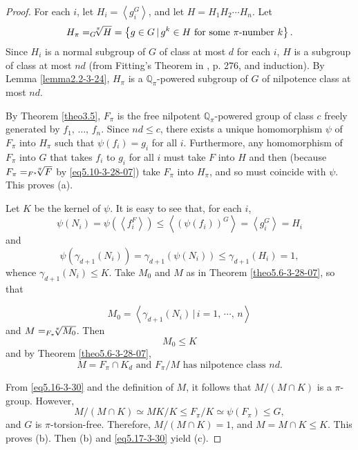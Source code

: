 \documentclass[mathscr]{amsart}
\theoremstyle{theorem}
\theoremstyle{definition}
\numberwithin{equation}{section}
\def \({\left(}
\def \){\right)}
\begin{document}
\begin{proof}
For each $i$, let $H_i=\left\langle g_i^G\right\rangle$, and let
$H=H_1H_2\cdots H_n$.  Let
$$
H_\pi=_G\hspace*{-0.2cm}\sqrt[\pi]{H}=\left\{g\in G\,|\,g^k\in
H\text{ for some }\pi\text{-number }k\right\}.
$$
Since $H_i$ is a normal subgroup of $G$ of class at most $d$ for
each $i$, $H$ is a subgroup of class at most $nd$ (from Fitting's
Theorem in \cite{Hup}, p. 276, and induction).  By Lemma
\ref{lemma2.2-3-24}, $H_\pi$ is a $\mathbb{Q}_\pi$-powered subgroup
of $G$ of nilpotence class at most $nd$.

By Theorem \ref{theo3.5}, $F_\pi$ is the free nilpotent
$\mathbb{Q}_\pi$-powered group of class $c$ freely generated by
$f_1,\,\dots,\,f_n$.  Since $nd\leq c$, there exists a unique
homomorphism $\psi$ of $F_\pi$ into $H_\pi$ such that
$\psi\(f_i\)=g_i$ for all $i$.  Furthermore, any homomorphism of
$F_\pi$ into $G$ that takes $f_i$ to $g_i$ for all $i$ must take $F$
into $H$ and then (because
$F_\pi=_{F^\star}\hspace*{-0.2cm}\sqrt[\pi]{F}$ by
\eqref{eq5.10-3-28-07}) take $F_\pi$ into $H_\pi$, and so must
coincide with $\psi$. This proves (a).

Let $K$ be the kernel of $\psi$.  It is easy to see that, for each
$i$,
$$
\psi\(N_i\)=\psi\(\left\langle f_i^F\right\rangle\)\leq\left\langle
\(\psi\(f_i\)\)^G\right\rangle =\left\langle g_i^G\right\rangle =
H_i
$$
and
$$
\psi\(\gamma_{d+1}\(N_i\)\)=\gamma_{d+1}\(\psi\(N_i\)\)\leq
\gamma_{d+1}\(H_i\)=1,
$$
whence $\gamma_{d+1}\(N_i\)\leq K$.  Take $M_0$ and $M$ as in
Theorem \ref{theo5.6-3-28-07}, so that

$$
M_0=\left\langle \gamma_{d+1}\(N_i\)\,|\,i=1,\,\cdots,\,
n\right\rangle
$$
and $M=_{F_\pi}\hspace*{-0.2cm}\sqrt[\pi]{M_0}$. %
Then
\begin{equation}\label{eq5.16-3-30}
M_0\leq K
\end{equation}
and by Theorem \ref{theo5.6-3-28-07},
\begin{equation}\label{eq5.17-3-30}
M=F_\pi\cap K_d\text{ and }F_\pi/M\text{ has nilpotence class }nd.
\end{equation}

From \eqref{eq5.16-3-30} and the definition of $M$, it follows that
$M/\(M\cap K\)$ is a $\pi$-group.  However,
$$
M/\(M\cap K\)\simeq MK/K\leq F_\pi/K\simeq \psi\(F_\pi\)\leq G,
$$
and $G$ is $\pi$-torsion-free.  Therefore, $M/\(M\cap K\)=1$, and
$M=M\cap K\leq K$.  This proves (b).  Then (b) and
\eqref{eq5.17-3-30} yield (c).
\end{proof}
\end{document}
